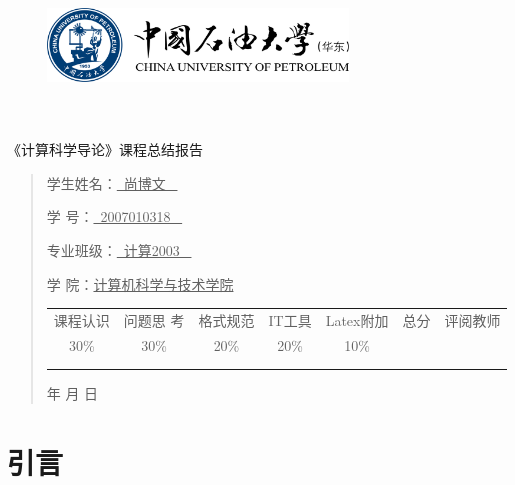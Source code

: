 \documentclass{article}
\renewcommand{\today}{\number\year 年 \number\month 月 \number\day 日}
\begin{document}
\begin{figure}
    \centering
    \includegraphics[width=8cm]{upc.png}
    \label{figupc}
\end{figure}

\begin{center}
	\quad \\
	\quad \\
	\heiti \fontsize{45}{17} \quad \quad \quad
	\vskip 1.5cm
	\heiti {} 《计算科学导论》课程总结报告
\end{center}

\vskip 2.0cm
	
\begin{quotation}
	\doublespacing
    \par\setlength\parindent{7em}
	\quad

	学生姓名：\underline{\quad \qquad \ 尚博文 \ \qquad \quad}

	学\hspace{0.6cm} 号：\underline{\qquad \ 2007010318 \ \qquad}
		
	专业班级：\underline{\qquad \ 计算2003 \ \qquad  }
		
    学\hspace{0.6cm} 院：\underline{计算机科学与技术学院}

	\vskip 2cm
	\centering
	\begin{table}[h]
        \centering
        \begin{tabular}{|c|c|c|c|c|c|c|}
            \hline
            课程认识 & 问题思 考 & 格式规范  & IT工具  & Latex附加  & 总分 & 评阅教师 \\
            30\% & 30\% & 20\% & 20\% & 10\% &  &  \\
            \hline
             & & & & & &\\
             & & & & & &\\
            \hline
        \end{tabular}
    \end{table}
	\vskip 2cm
	\today
\end{quotation}

\thispagestyle{empty}
\newpage

\setcounter{page}{1}

\section{引言}
\end{document}
